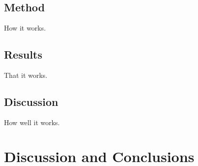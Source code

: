 \documentclass[11pt]{report}
\begin{document}
\subsection{Method}

How it works.


\subsection{Results}

That it works. 

\subsection{Discussion}

How well it works. 

\clearpage

\section{Discussion and Conclusions}\label{sec:conclusions}

\small
\renewcommand{\bibsep}{0em}

\renewcommand{\bibname}{References}


\end{document}
